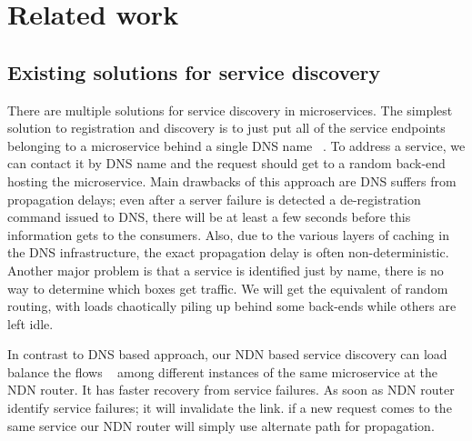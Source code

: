 \section{Related work}
\label{related}
\subsection{Existing solutions for service discovery}

There are multiple solutions for service discovery in microservices. The simplest solution to registration and discovery is to just put all of the service endpoints belonging to a microservice behind a single DNS name ~\cite{cheshire2013dns}. To address a service, we can contact it by DNS name and the request should get to a random back-end hosting the microservice. Main drawbacks of this approach are DNS suffers from propagation delays; even after a server failure is detected a de-registration command issued to DNS, there will be at least a few seconds before this information gets to the consumers. Also, due to the various layers of caching in the DNS infrastructure, the exact propagation delay is often non-deterministic. Another major problem is that a service is identified just by name, there is no way to determine which boxes get traffic. We will get the equivalent of random routing, with loads chaotically piling up behind some back-ends while others are left idle. 

In contrast to DNS based approach, our NDN based service discovery can load balance the flows ~\cite{tan2016flow} among different instances of the same microservice at the NDN router. It has faster recovery from service failures. As soon as NDN router identify service failures; it will invalidate the link. if a new request comes to the same service our NDN router will simply use alternate path for propagation. 

